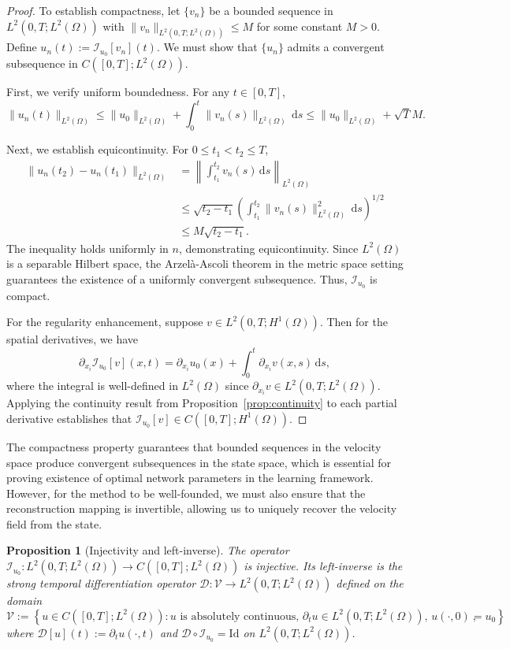 \documentclass[11pt,reqno]{amsart}
\theoremstyle{plain}
\newtheorem{proposition}[theorem]{Proposition}
\theoremstyle{definition}
\theoremstyle{remark}
\begin{document}
\begin{proof}
To establish compactness, let $\{v_n\}$ be a bounded sequence in $L^2(0,T; L^2(\Omega))$ with $\|v_n\|_{L^2(0,T; L^2(\Omega))} \leq M$ for some constant $M > 0$. Define $u_n(t) := \mathcal{I}_{u_0}[v_n](t)$. We must show that $\{u_n\}$ admits a convergent subsequence in $C([0,T]; L^2(\Omega))$.

\noindent First, we verify uniform boundedness. For any $t \in [0,T]$,
\[
\|u_n(t)\|_{L^2(\Omega)} \leq \|u_0\|_{L^2(\Omega)} + \int_0^t \|v_n(s)\|_{L^2(\Omega)} \, \mathrm{d}s \leq \|u_0\|_{L^2(\Omega)} + \sqrt{T} M.
\]

\noindent Next, we establish equicontinuity. For $0 \leq t_1 < t_2 \leq T$,
\begin{align*}
\|u_n(t_2) - u_n(t_1)\|_{L^2(\Omega)} 
&= \left\| \int_{t_1}^{t_2} v_n(s) \, \mathrm{d}s \right\|_{L^2(\Omega)} \\
&\leq \sqrt{t_2 - t_1} \left( \int_{t_1}^{t_2} \|v_n(s)\|_{L^2(\Omega)}^2 \, \mathrm{d}s \right)^{1/2} \\
&\leq M\sqrt{t_2 - t_1}.
\end{align*}
The inequality holds uniformly in $n$, demonstrating equicontinuity. Since $L^2(\Omega)$ is a separable Hilbert space, the Arzelà-Ascoli theorem in the metric space setting guarantees the existence of a uniformly convergent subsequence. Thus, $\mathcal{I}_{u_0}$ is compact.

\noindent For the regularity enhancement, suppose $v \in L^2(0,T; H^1(\Omega))$. Then for the spatial derivatives, we have
\[
\partial_{x_i} \mathcal{I}_{u_0}[v](x,t) = \partial_{x_i} u_0(x) + \int_0^t \partial_{x_i} v(x,s) \, \mathrm{d}s,
\]
where the integral is well-defined in $L^2(\Omega)$ since $\partial_{x_i} v \in L^2(0,T; L^2(\Omega))$. Applying the continuity result from Proposition~\ref{prop:continuity} to each partial derivative establishes that $\mathcal{I}_{u_0}[v] \in C([0,T]; H^1(\Omega))$.
\end{proof}

The compactness property guarantees that bounded sequences in the velocity space produce convergent subsequences in the state space, which is essential for proving existence of optimal network parameters in the learning framework. However, for the method to be well-founded, we must also ensure that the reconstruction mapping is invertible, allowing us to uniquely recover the velocity field from the state.

\begin{proposition}[Injectivity and left-inverse]\label{prop:injectivity}
The operator $\mathcal{I}_{u_0}: L^2(0,T; L^2(\Omega)) \to C([0,T]; L^2(\Omega))$ is injective. Its left-inverse is the strong temporal differentiation operator $\mathcal{D}: \mathcal{V} \to L^2(0,T; L^2(\Omega))$ defined on the domain
\[
\mathcal{V} := \left\{ u \in C([0,T]; L^2(\Omega)) : u \text{ is absolutely continuous, } \partial_t u \in L^2(0,T; L^2(\Omega)), \, u(\cdot,0) = u_0 \right\},
\]
where $\mathcal{D}[u](t) := \partial_t u(\cdot,t)$ and $\mathcal{D} \circ \mathcal{I}_{u_0} = \mathrm{Id}$ on $L^2(0,T; L^2(\Omega))$.
\end{proposition}
\end{document}
